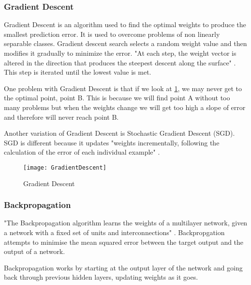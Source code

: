 \subsubsection*{Gradient Descent}
Gradient Descent is an algorithm used to find the optimal weights to produce the
smallest prediction error. It is used to overcome problems of non linearly
separable classes. Gradient descent search selects a random weight value and
then modifies it gradually to minimize the error. "At each step, the weight
vector is altered in the direction that produces the steepest descent along the
surface" \textcite{MLANN}. This step is iterated until the lowest value is met.

One problem with Gradient Descent is that if we look at \ref{fig:GD}, we may
never get to the optimal point, point B. This is because we will find point A
without too many problems but when the weights change we will get too high a
slope of error and therefore will never reach point B.

Another variation of Gradient Descent is Stochastic Gradient Descent (SGD). SGD
is different because it updates "weights incrementally, following the
calculation of the error of each individual example" \textcite{MLANN}. 

\begin{figure}
      \texttt{[image: GradientDescent]}
      \caption{Gradient Descent}
      \label{fig:GD}
 \end{figure}

\subsubsection*{Backpropagation}
"The Backpropagation algorithm learns the weights of a multilayer network,
given a network with a fixed set of units and interconnections" \textcite{MLANN}.
Backpropgation attempts to minimise the mean squared error between the target
output and the output of a network.

Backpropagation works by starting at the output layer of the network and going
back through previous hidden layers, updating weights as it goes.
